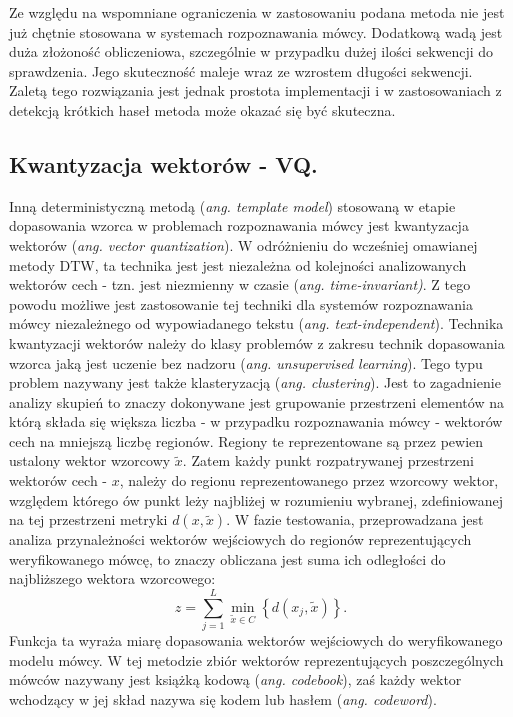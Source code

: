 Ze względu na wspomniane ograniczenia w zastosowaniu podana metoda nie jest już chętnie stosowana w systemach rozpoznawania mówcy. Dodatkową wadą jest duża złożoność obliczeniowa, szczególnie w przypadku dużej ilości sekwencji do sprawdzenia. Jego skuteczność maleje wraz ze wzrostem długości sekwencji. Zaletą tego rozwiązania jest jednak prostota implementacji i w zastosowaniach z detekcją krótkich haseł metoda może okazać się być skuteczna.

\subsection{Kwantyzacja wektorów - VQ.}
\label{vq}

Inną deterministyczną metodą (\textit{ang. template model}) stosowaną w etapie dopasowania wzorca w problemach rozpoznawania mówcy jest kwantyzacja wektorów (\textit{ang. vector quantization}). W odróżnieniu do wcześniej omawianej metody DTW, ta technika jest jest niezależna od kolejności analizowanych wektorów cech - tzn. jest niezmienny w czasie (\textit{ang. time-invariant)}. Z tego powodu możliwe jest zastosowanie tej techniki dla systemów rozpoznawania mówcy niezależnego od wypowiadanego tekstu (\textit{ang. text-independent}). 
Technika kwantyzacji wektorów należy do klasy problemów z zakresu technik dopasowania wzorca jaką jest uczenie bez nadzoru  (\textit{ang. unsupervised learning}). Tego typu problem nazywany jest także \cite{fosr} klasteryzacją (\textit{ang. clustering}). Jest to zagadnienie analizy skupień to znaczy dokonywane jest grupowanie przestrzeni elementów na którą składa się większa liczba - w przypadku rozpoznawania mówcy - wektorów cech na mniejszą liczbę regionów. Regiony te reprezentowane są przez pewien ustalony wektor wzorcowy $ \tilde{x}$. Zatem każdy punkt rozpatrywanej przestrzeni wektorów cech - $x$, należy do regionu reprezentowanego przez wzorcowy wektor, względem którego ów punkt leży najbliżej w rozumieniu wybranej, zdefiniowanej na tej przestrzeni metryki $d(x,\tilde{x})$.
W fazie testowania, przeprowadzana jest analiza przynależności wektorów wejściowych do regionów reprezentujących weryfikowanego mówcę, to znaczy obliczana jest suma ich odległości do najbliższego wektora wzorcowego:
\begin{equation}
  z = \sum_{j=1}^{L} \min_{\tilde{x} \in  C} \left\{ d(x_j, \tilde{x}) \right\}. 
\end{equation}
Funkcja ta wyraża miarę dopasowania wektorów wejściowych do weryfikowanego modelu mówcy. 
W tej metodzie zbiór wektorów reprezentujących poszczególnych mówców nazywany jest książką kodową (\textit{ang. codebook}), zaś każdy wektor wchodzący w jej skład nazywa się kodem lub hasłem (\textit{ang. codeword}).

